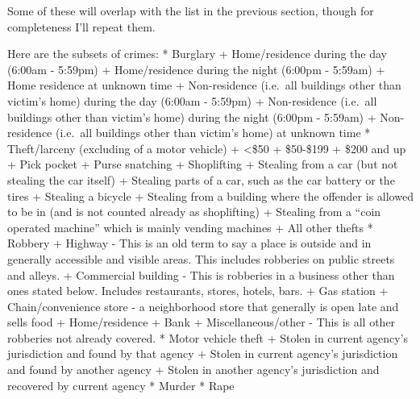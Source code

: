 \documentclass[
]{krantz}
\begin{document}
Some of these will overlap with the list in the previous
section, though for completeness I'll repeat them.

Here are the subsets of crimes: * Burglary + Home/residence
during the day (6:00am - 5:59pm) + Home/residence during the
night (6:00pm - 5:59am) + Home residence at unknown time +
Non-residence (i.e.~all buildings other than victim's home)
during the day (6:00am - 5:59pm) + Non-residence (i.e.~all
buildings other than victim's home) during the night (6:00pm
- 5:59am) + Non-residence (i.e.~all buildings other than
victim's home) at unknown time * Theft/larceny (excluding of
a motor vehicle) + \textless\$50 + \$50-\$199 + \$200 and up
+ Pick pocket + Purse snatching + Shoplifting + Stealing
from a car (but not stealing the car itself) + Stealing
parts of a car, such as the car battery or the tires +
Stealing a bicycle + Stealing from a building where the
offender is allowed to be in (and is not counted already as
shoplifting) + Stealing from a ``coin operated machine''
which is mainly vending machines + All other thefts *
Robbery + Highway - This is an old term to say a place is
outside and in generally accessible and visible areas. This
includes robberies on public streets and alleys. +
Commercial building - This is robberies in a business other
than ones stated below. Includes restaurants, stores,
hotels, bars. + Gas station + Chain/convenience store - a
neighborhood store that generally is open late and sells
food + Home/residence + Bank + Miscellaneous/other - This is
all other robberies not already covered. * Motor vehicle
theft + Stolen in current agency's jurisdiction and found by
that agency + Stolen in current agency's jurisdiction and
found by another agency + Stolen in another agency's
jurisdiction and recovered by current agency * Murder * Rape
\end{document}
